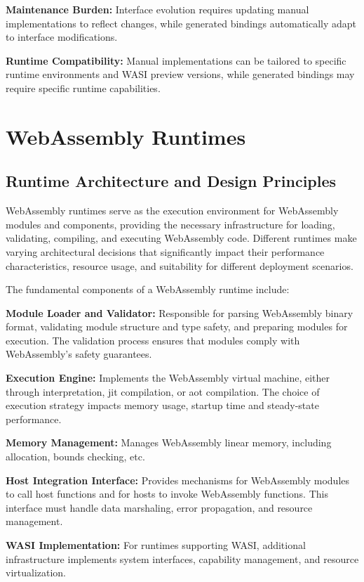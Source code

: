 \textbf{Maintenance Burden:} Interface evolution requires updating manual implementations to reflect changes, while generated bindings automatically adapt to interface modifications.

\textbf{Runtime Compatibility:} Manual implementations can be tailored to specific runtime environments and WASI preview versions, while generated bindings may require specific runtime capabilities.

\section{WebAssembly Runtimes}
\label{sec:wasm-runtimes}

\subsection{Runtime Architecture and Design Principles}
\label{subsec:runtime-architecture}

WebAssembly runtimes serve as the execution environment for WebAssembly modules and components, providing the necessary infrastructure for loading, validating, compiling, and executing WebAssembly code. Different runtimes make varying architectural decisions that significantly impact their performance characteristics, resource usage, and suitability for different deployment scenarios.

The fundamental components of a WebAssembly runtime include:

\textbf{Module Loader and Validator:} Responsible for parsing WebAssembly binary format, validating module structure and type safety, and preparing modules for execution. The validation process ensures that modules comply with WebAssembly's safety guarantees.

\textbf{Execution Engine:} Implements the WebAssembly virtual machine, either through interpretation, \acrfull{jit} compilation, or \acrfull{aot} compilation. The choice of execution strategy impacts memory usage, startup time and steady-state performance.

\textbf{Memory Management:} Manages WebAssembly linear memory, including allocation, bounds checking, etc.

\textbf{Host Integration Interface:} Provides mechanisms for WebAssembly modules to call host functions and for hosts to invoke WebAssembly functions. This interface must handle data marshaling, error propagation, and resource management.

\textbf{WASI Implementation:} For runtimes supporting WASI, additional infrastructure implements system interfaces, capability management, and resource virtualization.

